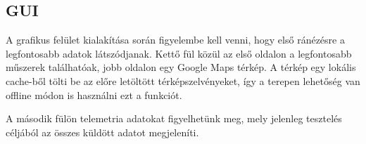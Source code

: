 \documentclass[12pt]{article}
\begin{document}
\begin{itemize}
\begin{verbatim}
\end{verbatim}

\subsection{GUI}
A grafikus felület kialakítása során figyelembe kell venni, hogy els\H{o} ránézésre a legfontosabb adatok látszódjanak. Kett\H{o} fül közül az els\H{o} oldalon a legfontosabb m\H{u}szerek találhatóak, jobb oldalon egy Google Maps térkép. A térkép egy lokális cache-b\H{o}l tölti be az el\H{o}re letöltött térképszelvényeket, így a terepen lehet\H{o}ség van offline módon is használni ezt a funkciót.

\begin{figure}[H]
	\centering
	\caption{}
	\label{fig:gui}
\end{figure}

A második fülön telemetria adatokat figyelhetünk meg, mely jelenleg tesztelés céljából az összes küldött adatot megjeleníti.

\begin{figure}[H]
	\centering
	\caption{}
	\label{fig:gui2}
\end{figure}


\end{itemize}
\end{document}
